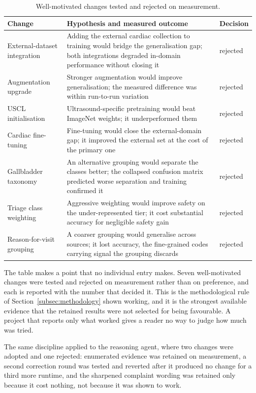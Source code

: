\begin{table}[H]
  \centering
  \small
  \caption{Well-motivated changes tested and rejected on measurement.}
  \label{tab:rejected}
  \begin{tabularx}{\textwidth}{@{}lXl@{}}
    \toprule
    Change & Hypothesis and measured outcome & Decision \\
    \midrule
    External-dataset integration & Adding the external cardiac collection to training would
      bridge the generalisation gap; both integrations degraded in-domain performance without
      closing it & rejected \\
    Augmentation upgrade & Stronger augmentation would improve generalisation; the measured
      difference was within run-to-run variation & rejected \\
    USCL initialisation & Ultrasound-specific pretraining would beat ImageNet weights; it
      underperformed them & rejected \\
    Cardiac fine-tuning & Fine-tuning would close the external-domain gap; it improved the
      external set at the cost of the primary one & rejected \\
    Gallbladder taxonomy & An alternative grouping would separate the classes better; the
      collapsed confusion matrix predicted worse separation and training confirmed it &
      rejected \\
    Triage class weighting & Aggressive weighting would improve safety on the
      under-represented tier; it cost substantial accuracy for negligible safety gain &
      rejected \\
    Reason-for-visit grouping & A coarser grouping would generalise across sources; it lost
      accuracy, the fine-grained codes carrying signal the grouping discards & rejected \\
    \bottomrule
  \end{tabularx}
\end{table}

The table makes a point that no individual entry makes. Seven well-motivated changes were
tested and rejected on measurement rather than on preference, and each is reported with the
number that decided it. This is the methodological rule of Section~\ref{subsec:methodology}
shown working, and it is the strongest available evidence that the retained results were not
selected for being favourable. A project that reports only what worked gives a reader no way
to judge how much was tried.

The same discipline applied to the reasoning agent, where two changes were adopted and one
rejected: enumerated evidence was retained on measurement, a second correction round was
tested and reverted after it produced no change for a third more runtime, and the sharpened
complaint wording was retained only because it cost nothing, not because it was shown to work.

